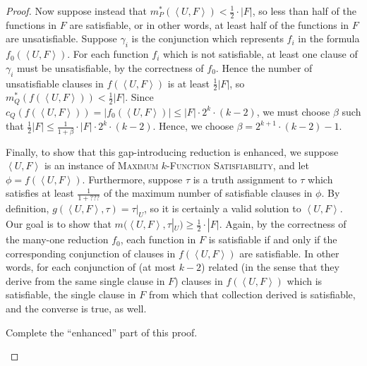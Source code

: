 \documentclass[]{article}
\newcommand{\pair}[2]{{\left\langle{#1}, {#2}\right\rangle}}
\begin{document}
\begin{proof}
  Now suppose instead that $m^*_P(\pair{U}{F}) < \frac{1}{2} \cdot |F|$, so less than half of the functions in $F$ are satisfiable, or in other words, at least half of the functions in $F$ are unsatisfiable.
  Suppose $\gamma_i$ is the conjunction which represents $f_i$ in the formula $f_0(\pair{U}{F})$.
  For each function $f_i$ which is not satisfiable, at least one clause of $\gamma_i$ must be unsatisfiable, by the correctness of $f_0$.
  Hence the number of unsatisfiable clauses in $f(\pair{U}{F})$ is at least $\frac{1}{2}|F|$, so $m^*_Q(f(\pair{U}{F})) < \frac{1}{2} |F|$.
  Since $c_Q(f(\pair{U}{F})) = |f_0(\pair{U}{F})| \leq |F| \cdot 2^k \cdot (k - 2)$, we must choose $\beta$ such that $\frac{1}{2} |F| \leq \frac{1}{1 + \beta} \cdot |F| \cdot 2^k \cdot (k - 2)$.
  Hence, we choose $\beta = 2^{k + 1} \cdot (k - 2) - 1$.

  Finally, to show that this gap-introducing reduction is enhanced, we suppose $\pair{U}{F}$ is an instance of \textsc{Maximum $k$-Function Satisfiability}, and let $\phi = f(\pair{U}{F})$.
  Furthermore, suppose $\tau$ is a truth assignment to $\tau$ which satisfies at least $\frac{1}{1 + ???}$ of the maximum number of satisfiable clauses in $\phi$.
  By definition, $g(\pair{U}{F}, \tau) = \tau|_U$, so it is certainly a valid solution to $\pair{U}{F}$.
  Our goal is to show that $m(\pair{U}{F}, \tau|_U) \geq \frac{1}{2} \cdot |F|$.
  Again, by the correctness of the many-one reduction $f_0$, each function in $F$ is satisfiable if and only if the corresponding conjunction of clauses in $f(\pair{U}{F})$ are satisfiable.
  In other words, for each conjunction of (at most $k - 2$) related (in the sense that they derive from the same single clause in $F$) clauses in $f(\pair{U}{F})$ which is satisfiable, the single clause in $F$ from which that collection derived is satisfiable, and the converse is true, as well.
  \begin{todo}
    Complete the ``enhanced'' part of this proof.
  \end{todo}
\end{proof}
\end{document}
